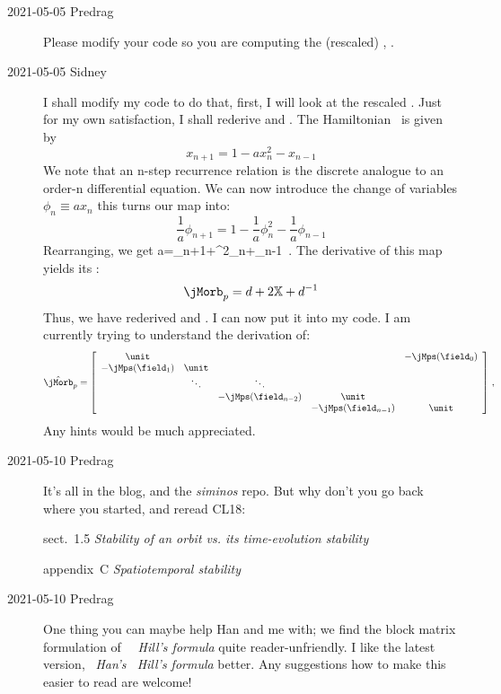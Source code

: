 \begin{description}
\item[2021-05-05 Predrag]
Please modify your code so you are computing the (rescaled) {\henlatt}
, {\jacobianOrb} .

\item[2021-05-05 Sidney]
I shall modify my code to do that, first, I will look at the rescaled
{\henlatt} . Just for my own satisfaction, I shall
rederive  and . The
Hamiltonian \HenonMap\ is given by
$$x_{n+1}=1-ax_n^2-x_{n-1}$$
We note that an n-step recurrence relation is the discrete analogue to an
order-n differential equation. We can now introduce the change of
variables $\phi_n\equiv ax_n$ this turns our map into:
$$\frac{1}{a}\phi_{n+1}=1-\frac{1}{a}\phi^2_n-\frac{1}{a}\phi_{n-1}$$
Rearranging, we get
\beq
a=\phi_{n+1}+\phi^2_n+\phi_{n-1}
\,.
The derivative of this map yields its {\jacobianOrb}:
$$\jMorb_p=\shift+2{\mathbb{X}}+\shift^{-1}$$
Thus, we have rederived  and
. I can now put it into my code. I am currently
trying to understand the derivation of:
\[
\hat{\jMorb}_p =
\left[
\begin{array}{ccccc}
 {\unit} &  &  &  & -\jMps(\field_0) \\
 -\jMps(\field_1) & {\unit} &  &  &  \\
  & \ddots & \ddots &  &  \\
  &  & -\jMps(\field_{n-2}) & {\unit} &  \\
  &  &  & -\jMps(\field_{n-1}) & {\unit} \\
\end{array}
\right] \, ,
\]
Any hints would be much appreciated.

\item[2021-05-10 Predrag]
It's all in the blog,  and the \emph{siminos} repo. But why don't you go
back where you started, and reread CL18:

{sect.~1.5} {\em  Stability of an orbit vs.  its time-evolution stability}

{appendix~C} {\em Spatiotemporal stability}

\item[2021-05-10 Predrag]
One thing you can maybe help Han and me with; we find the block matrix
formulation of ~{\em \catLatt\ Hill's formula}
quite reader-unfriendly. I like the latest version,
~{\em Han's  \HenonMap\ Hill's formula} better.
Any suggestions how to make this easier to read are welcome!


\end{description}
